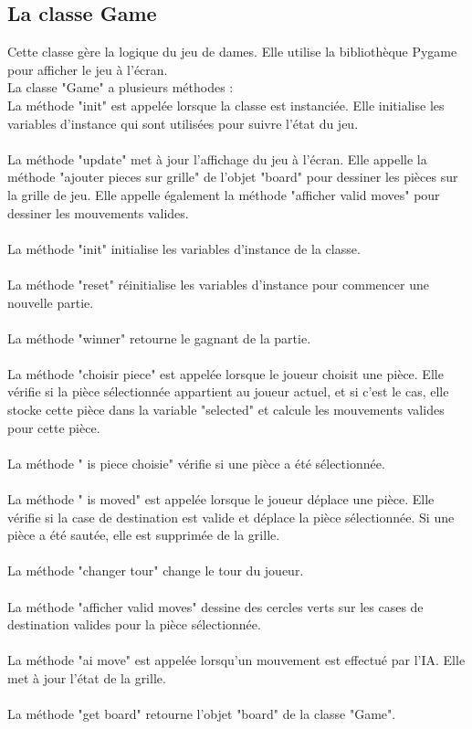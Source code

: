 \documentclass[12pt]{article}
\begin{document}
	 \subsection{La classe Game}
	 Cette classe gère la logique du jeu de dames. Elle utilise la bibliothèque Pygame pour afficher le jeu à l'écran.\\
	 La classe "Game" a plusieurs méthodes :\\
	 La méthode "init" est appelée lorsque la classe est instanciée. Elle initialise les variables d'instance qui sont utilisées pour suivre l'état du jeu.\\
	 \\
	 La méthode "update" met à jour l'affichage du jeu à l'écran. Elle appelle la méthode "ajouter pieces sur grille" de l'objet "board" pour dessiner les pièces sur la grille de jeu. Elle appelle également la méthode "afficher valid moves" pour dessiner les mouvements valides.\\
	 \\
	 La méthode "init" initialise les variables d'instance de la classe.\\
	 \\
	 La méthode "reset" réinitialise les variables d'instance pour commencer une nouvelle partie.\\
	 \\
	 La méthode "winner" retourne le gagnant de la partie.\\
	 \\
	 La méthode "choisir piece" est appelée lorsque le joueur choisit une pièce. Elle vérifie si la pièce sélectionnée appartient au joueur actuel, et si c'est le cas, elle stocke cette pièce dans la variable "selected" et calcule les mouvements valides pour cette pièce.\\
	 \\
	 La méthode " is piece choisie" vérifie si une pièce a été sélectionnée.\\
	 \\
	 La méthode " is moved" est appelée lorsque le joueur déplace une pièce. Elle vérifie si la case de destination est valide et déplace la pièce sélectionnée. Si une pièce a été sautée, elle est supprimée de la grille.\\
	 \\
	 La méthode "changer tour" change le tour du joueur.\\
	 \\
	 La méthode "afficher valid moves" dessine des cercles verts sur les cases de destination valides pour la pièce sélectionnée.\\
	 \\
	 La méthode "ai move" est appelée lorsqu'un mouvement est effectué par l'IA. Elle met à jour l'état de la grille.\\
	 \\
	 La méthode "get board" retourne l'objet "board" de la classe "Game".
\end{document}
